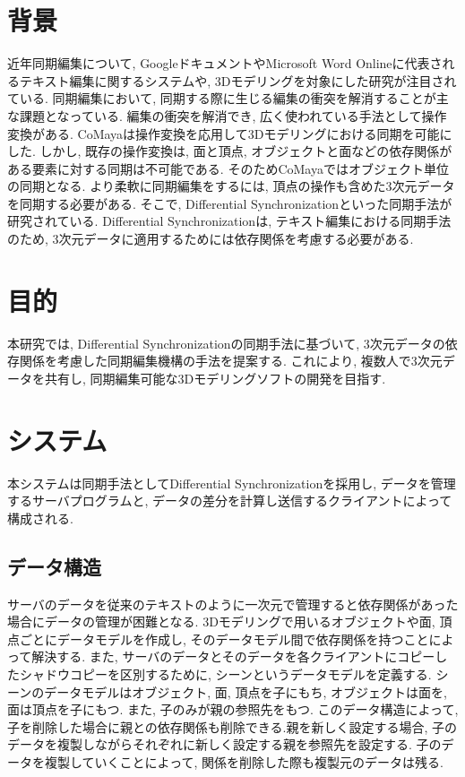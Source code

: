 \documentclass{AIabst}
\begin{document}
\makeAbstHeader
%
%
%
\section{背景}
	近年同期編集について, GoogleドキュメントやMicrosoft Word Onlineに代表されるテキスト編集に関するシステムや, 3Dモデリングを対象にした研究が注目されている.
	同期編集において, 同期する際に生じる編集の衝突を解消することが主な課題となっている.
	編集の衝突を解消でき, 広く使われている手法として操作変換がある.
	CoMaya\cite{COMAYA}は操作変換を応用して3Dモデリングにおける同期を可能にした.
	しかし, 既存の操作変換は, 面と頂点, オブジェクトと面などの依存関係がある要素に対する同期は不可能である.
	そのためCoMayaではオブジェクト単位の同期となる.
	より柔軟に同期編集をするには, 頂点の操作も含めた3次元データを同期する必要がある.
	そこで, Differential Synchronization\cite{DS}といった同期手法が研究されている.
	Differential Synchronizationは, テキスト編集における同期手法のため, 3次元データに適用するためには依存関係を考慮する必要がある.
\section{目的}
 本研究では, Differential Synchronizationの同期手法に基づいて, 3次元データの依存関係を考慮した同期編集機構の手法を提案する.
  これにより, 複数人で3次元データを共有し, 同期編集可能な3Dモデリングソフトの開発を目指す.
\section{システム}
 本システムは同期手法としてDifferential Synchronizationを採用し, データを管理するサーバプログラムと, データの差分を計算し送信するクライアントによって構成される.
  \subsection{データ構造}
	サーバのデータを従来のテキストのように一次元で管理すると依存関係があった場合にデータの管理が困難となる.
  3Dモデリングで用いるオブジェクトや面, 頂点ごとにデータモデルを作成し, そのデータモデル間で依存関係を持つことによって解決する.
  また, サーバのデータとそのデータを各クライアントにコピーしたシャドウコピーを区別するために, シーンというデータモデルを定義する.
  シーンのデータモデルはオブジェクト, 面, 頂点を子にもち, オブジェクトは面を, 面は頂点を子にもつ. また, 子のみが親の参照先をもつ.
   このデータ構造によって, 子を削除した場合に親との依存関係も削除できる.親を新しく設定する場合, 子のデータを複製しながらそれぞれに新しく設定する親を参照先を設定する.
   子のデータを複製していくことによって, 関係を削除した際も複製元のデータは残る.
\end{document}
